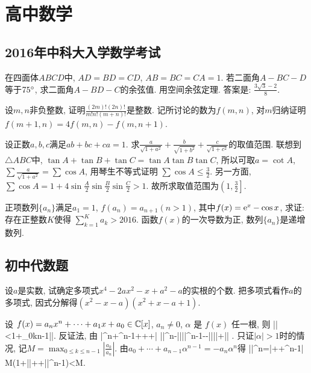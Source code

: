 \chapter{高中数学}


\section{2016年中科大入学数学考试}
\bq{}{}
在四面体$ABCD$中, $AD=BD=CD$, $AB=BC=CA=1$. 若二面角$A-BC-D$等于$75^\circ$, 求二面角$A-BD-C$的余弦值.
\eq
\ba
用空间余弦定理. 答案是: $\frac{3\sqrt{3}-2}{8}$.
\ea

\bq{}{}
设$m,n$非负整数, 证明$\frac{(2m)!(2n)!}{m!n!(m+n)!}$是整数.
\eq
\ba
记所讨论的数为$f(m,n)$, 对$m$归纳证明$f(m+1,n)=4f(m,n)-f(m,n+1)$.
\ea

\bq{}{}
设正数$a, b, c$满足$ab+bc+ca=1$. 求$\frac{a}{\sqrt{1+a^2}}+\frac{b}{\sqrt{1+b^2}}+\frac{c}{\sqrt{1+c^2}}$的取值范围.
\eq
\ba
联想到$\triangle ABC$中, $\tan A+\tan B+\tan C=\tan A\tan B\tan C$,
所以可取$a=\cot A$, $\sum\frac{a}{\sqrt{1+a^2}}=\sum\cos A$, 用琴生不等式证明
$\sum\cos A\le\frac32$. 另一方面, $\sum\cos A=1+4\sin\frac{A}{2}\sin\frac{B}{2}\sin\frac{C}{2}>1$.
故所求取值范围为$\left(1,\frac32\right]$.
\ea

\bq{}{}
正项数列$\{a_n\}$满足$a_1=1$, $f(a_n)=a_{n+1}(n>1)$, 其中$f(x)=\mathrm{e}^x-\cos x$, 求证: 存在正整数$K$使得
$\sum\limits_{k=1}^{K}a_{k}>2016$.
\eq
\ba
函数$f(x)$的一次导数为正, 数列$\{a_{n}\}$是递增数列.
\ea


\section{初中代数题}
\bq{}{}
设$a$是实数, 试确定多项式$x^4-2ax^2-x+a^2-a$的实根的个数.
\eq
\ba
把多项式看作$a$的多项式, 因式分解得$(x^2-x-a)(x^2+x-a+1)$.
\ea

设 $f(x)=a_nx^n+\cdots+a_1x+a_0\in\Bbb C[x]$, $a_n\ne0$, $\alpha$ 是 $f(x)$ 任一根, 则
\bee
|\alpha|<1+\max_{0\le k\le n-1}\left|\right|.
\eee
\eq
\ba
反证法, 由
\bee
 \left|\alpha^n+\alpha^{n-1}+\cdots+\alpha+\right|
 \ge |\alpha|^n-\left|\right|\cdot|\alpha|^{n-1}-\cdots-\left|\right|\cdot|\alpha|+\left|\right|
 .
\eee
\ea
\ba
只证$|\alpha|>1$时的情况, 记$M=\max_{0\le k\le n-1}\left|\frac{a_k}{a_n}\right|$. 由$a_0+\cdots+a_{n-1}\alpha^{n-1}=-a_{n}\alpha^n$得
\bee
|\alpha|^n=\left|+\cdots+\alpha^{n-1}\right|
\le M(1+|\alpha|+\cdots+|\alpha|^{n-1})<M.
\eee
\ea

